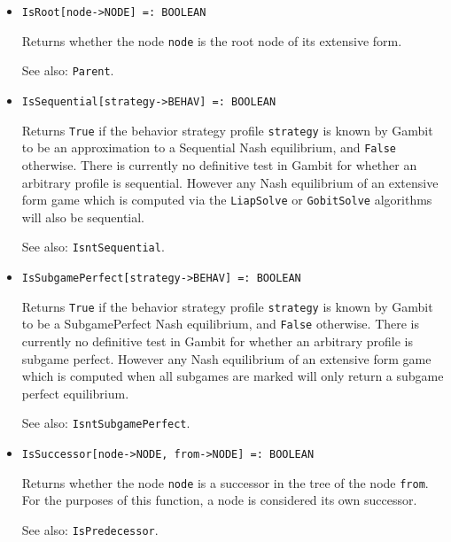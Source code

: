 \begin{itemize}
\item
\protect \large \begin{verbatim}
IsRoot[node->NODE] =: BOOLEAN
\end{verbatim}\normalsize

\bd
Returns whether the node \verb+node+ is the root node of its
extensive form.
\item
[See also:] {\tt Parent}.
\ed

\item
\protect \large \begin{verbatim}
IsSequential[strategy->BEHAV] =: BOOLEAN
\end{verbatim}\normalsize

\bd 
Returns \verb+True+ if the behavior strategy profile
\verb+strategy+ is known by Gambit to be an approximation to a
Sequential Nash equilibrium, and \verb+False+ otherwise.  There is
currently no definitive test in Gambit for whether an arbitrary
profile is sequential.  However any Nash equilibrium of an extensive
form game which is computed via the \verb+LiapSolve+ or
\verb+GobitSolve+ algorithms will also be sequential.
\item
[See also:] {\tt IsntSequential}.
\ed

\item
\protect \large \begin{verbatim}
IsSubgamePerfect[strategy->BEHAV] =: BOOLEAN
\end{verbatim}\normalsize

\bd Returns \verb+True+ if the behavior strategy profile
\verb+strategy+ is known by Gambit to be a SubgamePerfect Nash
equilibrium, and \verb+False+ otherwise.  There is currently no
definitive test in Gambit for whether an arbitrary profile is subgame
perfect.  However any Nash equilibrium of an extensive form game which
is computed when all subgames are marked will only return a subgame
perfect equilibrium.  
\item
[See also:] {\tt IsntSubgamePerfect}.
\ed

\item
\protect \large \begin{verbatim}
IsSuccessor[node->NODE, from->NODE] =: BOOLEAN
\end{verbatim}\normalsize

\bd
Returns whether the node \verb+node+ is a successor
in the tree of the node \verb+from+.  For the purposes of this function,
a node is considered its own successor.
\item
[See also:] {\tt IsPredecessor}.
\ed


\end{itemize}
